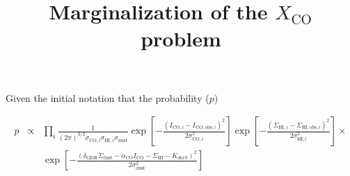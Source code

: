 \documentclass[12pt,preprint]{aastex}
\begin{document}

\title{Marginalization of the $X_{\mathrm{CO}}$ problem}

Given the initial notation that the probability ($p$)

\begin{eqnarray*}
p &\propto & \prod_i \frac{1}{(2\pi)^{3/2}\sigma_{\mathrm{CO},i}  
\sigma_{\mathrm{HI},i}  \sigma_{\mathrm{dust}}}  
\exp\left[-\frac{(I_{\mathrm{CO},i}-I_{\mathrm{CO,obs},i})^2}
{2\sigma^2_{\mathrm{CO},i}}\right]
\exp\left[-\frac{(\Sigma_{\mathrm{HI},i}-\Sigma_{\mathrm{HI,obs},i})^2}
{2\sigma^2_{\mathrm{HI},i}}\right]\times \\
&& \exp\left[-\frac{(\delta_{\mathrm{GDR}}\Sigma_{\mathrm{dust}}- \alpha_{\mathrm{CO}} I_{\mathrm{CO}}-\Sigma_{\mathrm{HI}}-K_{dark})^2}{2\sigma_{\mathrm{dust}}^2}\right]
\end{eqnarray*}
\end{document}
